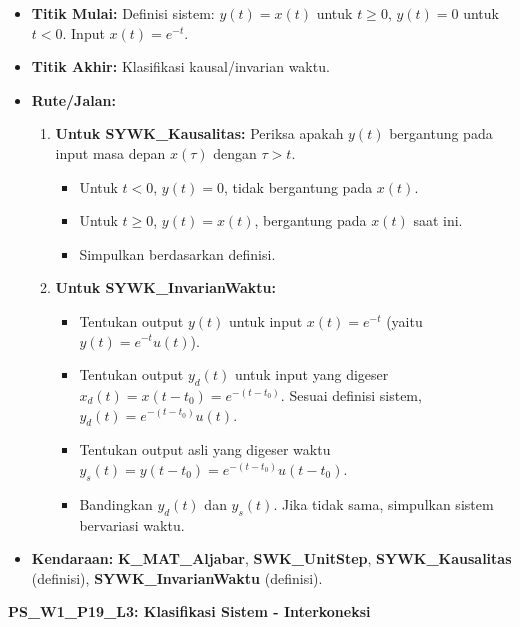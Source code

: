 \documentclass[
  letterpaper,
  DIV=11,
  numbers=noendperiod]{scrreprt}
\providecommand{\tightlist}{%
  \setlength{\itemsep}{0pt}\setlength{\parskip}{0pt}}\usepackage{longtable,booktabs,array}
\begin{document}
\begin{itemize}
\tightlist
\item
  \textbf{Titik Mulai:} Definisi sistem: \(y(t) = x(t)\) untuk
  \(t \ge 0\), \(y(t) = 0\) untuk \(t < 0\). Input \(x(t) = e^{-t}\).
\item
  \textbf{Titik Akhir:} Klasifikasi kausal/invarian waktu.
\item
  \textbf{Rute/Jalan:}

  \begin{enumerate}
  \def\labelenumi{\arabic{enumi}.}
  \tightlist
  \item
    \textbf{Untuk SYWK\_Kausalitas:} Periksa apakah \(y(t)\) bergantung
    pada input masa depan \(x(\tau)\) dengan \(\tau > t\).

    \begin{itemize}
    \tightlist
    \item
      Untuk \(t < 0\), \(y(t)=0\), tidak bergantung pada \(x(t)\).
    \item
      Untuk \(t \ge 0\), \(y(t)=x(t)\), bergantung pada \(x(t)\) saat
      ini.
    \item
      Simpulkan berdasarkan definisi.
    \end{itemize}
  \item
    \textbf{Untuk SYWK\_InvarianWaktu:}

    \begin{itemize}
    \tightlist
    \item
      Tentukan output \(y(t)\) untuk input \(x(t) = e^{-t}\) (yaitu
      \(y(t) = e^{-t} u(t)\)).
    \item
      Tentukan output \(y_d(t)\) untuk input yang digeser
      \(x_d(t) = x(t-t_0) = e^{-(t-t_0)}\). Sesuai definisi sistem,
      \(y_d(t) = e^{-(t-t_0)} u(t)\).
    \item
      Tentukan output asli yang digeser waktu
      \(y_s(t) = y(t-t_0) = e^{-(t-t_0)} u(t-t_0)\).
    \item
      Bandingkan \(y_d(t)\) dan \(y_s(t)\). Jika tidak sama, simpulkan
      sistem bervariasi waktu.
    \end{itemize}
  \end{enumerate}
\item
  \textbf{Kendaraan:} \textbf{K\_MAT\_Aljabar}, \textbf{SWK\_UnitStep},
  \textbf{SYWK\_Kausalitas} (definisi), \textbf{SYWK\_InvarianWaktu}
  (definisi).
\end{itemize}

\textbf{PS\_W1\_P19\_L3: Klasifikasi Sistem - Interkoneksi}
\end{document}
